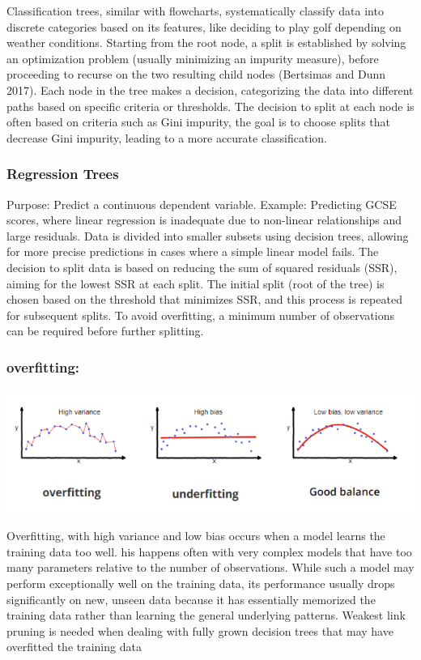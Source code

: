 \documentclass[
  letterpaper,
  DIV=11,
  numbers=noendperiod]{scrreprt}
\begin{document}
Classification trees, similar with flowcharts, systematically classify
data into discrete categories based on its features, like deciding to
play golf depending on weather conditions. Starting from the root node,
a split is established by solving an optimization problem (usually
minimizing an impurity measure), before proceeding to recurse on the two
resulting child nodes (Bertsimas and Dunn 2017). Each node in the tree
makes a decision, categorizing the data into different paths based on
specific criteria or thresholds. The decision to split at each node is
often based on criteria such as Gini impurity, the goal is to choose
splits that decrease Gini impurity, leading to a more accurate
classification.

\subsubsection{Regression Trees}\label{regression-trees}

Purpose: Predict a continuous dependent variable. Example: Predicting
GCSE scores, where linear regression is inadequate due to non-linear
relationships and large residuals. Data is divided into smaller subsets
using decision trees, allowing for more precise predictions in cases
where a simple linear model fails. The decision to split data is based
on reducing the sum of squared residuals (SSR), aiming for the lowest
SSR at each split. The initial split (root of the tree) is chosen based
on the threshold that minimizes SSR, and this process is repeated for
subsequent splits. To avoid overfitting, a minimum number of
observations can be required before further splitting.

\subsubsection{overfitting:}\label{overfitting}

\includegraphics{overfitting.png}

Overfitting, with high variance and low bias occurs when a model learns
the training data too well. his happens often with very complex models
that have too many parameters relative to the number of observations.
While such a model may perform exceptionally well on the training data,
its performance usually drops significantly on new, unseen data because
it has essentially memorized the training data rather than learning the
general underlying patterns. Weakest link pruning is needed when dealing
with fully grown decision trees that may have overfitted the training
data
\end{document}
